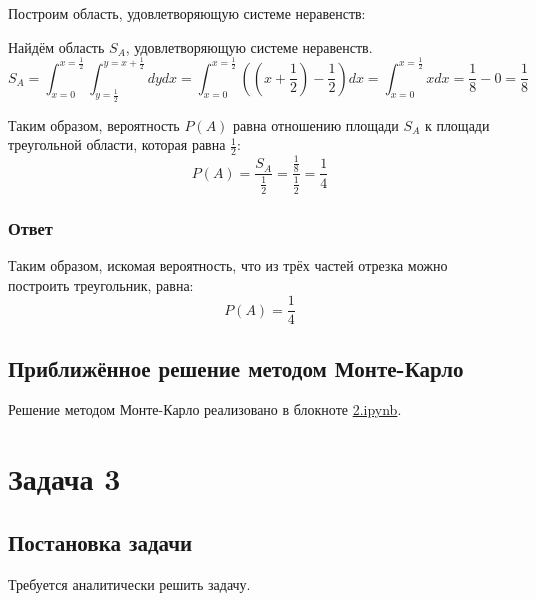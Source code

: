 \documentclass[a4paper,14pt]{extarticle}
\begin{document}
                Построим область, удовлетворяющую системе неравенств:
                
                Найдём область \( S_A \), удовлетворяющую системе неравенств.
                \[
                    S_A =
                    \int_{x = 0}^{x = \frac{1}{2}}
                    \int_{y = \frac{1}{2}}^{y = x + \frac{1}{2}} dy dx =
                    \int_{x = 0}^{x = \frac{1}{2}}
                    ((x + \frac{1}{2}) - \frac{1}{2}) dx =
                    \int_{x = 0}^{x = \frac{1}{2}} x dx =
                    \frac{1}{8} - 0 = \frac{1}{8}
                \]
                
                Таким образом, вероятность \( P(A) \) равна отношению площади \( S_A \) к площади треугольной области, которая равна \( \frac{1}{2} \):
                \[
                    P(A) = \frac{S_A}{\frac{1}{2}} = \frac{\frac{1}{8}}{\frac{1}{2}} = \frac{1}{4}
                \]
            
            \subsubsection*{Ответ}
                Таким образом, искомая вероятность, что из трёх частей отрезка можно построить треугольник, равна:
                \[
                    \boxed{P(A) = \frac{1}{4}}
                \]
        
        \subsection*{Приближённое решение методом Монте-Карло}
            Решение методом Монте-Карло реализовано в блокноте \href{https://github.com/vorandpav/TVIPS}{2.ipynb}.


    
    \section*{Задача 3}
        
        \subsection*{Постановка задачи}
            
            Требуется аналитически решить задачу.
        
\end{document}
